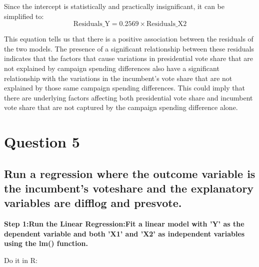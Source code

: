 \documentclass[12pt]{article}
\begin{document}
 Since the intercept is statistically and practically insignificant, it can be simplified to:
  \begin{equation}
\text{Residuals\_Y} = 0.2569 \times \text{Residuals\_X2}
\end{equation}



This equation tells us that there is a positive association between the residuals of the two models. The presence of a significant relationship between these residuals indicates that the factors that cause variations in presidential vote share that are not explained by campaign spending differences also have a significant relationship with the variations in the incumbent’s vote share that are not explained by those same campaign spending differences. This could imply that there are underlying factors affecting both presidential vote share and incumbent vote share that are not captured by the campaign spending difference alone.
\newpage
\section{Question 5}
\subsection{Run a regression where the outcome variable is the incumbent's voteshare and the
explanatory variables are difflog and presvote.}
\textbf{Step 1:Run the Linear Regression:Fit a linear model with 'Y' as the dependent variable and both 'X1' and 'X2' as  independent variables using the lm() function.}

Do it in R:
\end{document}
